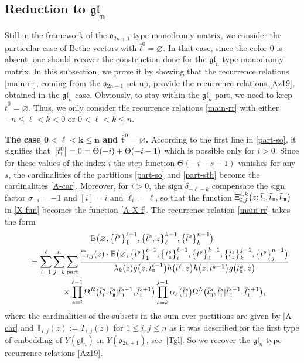 \documentclass[pdftex]{sigma}
\newcommand{\so}{\scriptscriptstyle \rm I}
\newcommand{\st}{\scriptscriptstyle \rm I\hspace{-1pt}I}
\newcommand{\sth}{\scriptscriptstyle \rm I\hspace{-1pt}I\hspace{-1pt}I}
\newcommand{\bt}{{\bar t}}
\theoremstyle{definition}
\def\BB{{\mathbb{B}}}
\def\TT{{\mathbb{T}}}
\def\r#1{\eqref{#1}}
\def\Oml{\Omega^L}
\def\Omr{\Omega^R}
\begin{document}
\subsection[Reduction to gl\_n]{Reduction to $\boldsymbol{\mathfrak{gl}_n}$}\label{sect:red-gln}
Still in the framework of the $\mathfrak{o}_{2n+1}$-type monodromy matrix,
we consider the particular case of Bethe vectors with $\bt^0=\varnothing$. In that case,
since the color 0 is absent, one should recover the construction done for the
$\mathfrak{gl}_{n}$-type monodromy matrix. In this subsection, we prove it by showing that the recurrence relations
\r{main-rr}, coming from the $\mathfrak{o}_{2n+1}$ set-up, provide the recurrence relations \eqref{Az19},
obtained in the
$\mathfrak{gl}_{n}$ case. Obviously, to stay within the $\mathfrak{gl}_{n}$ part, we need to keep
$\bt^0=\varnothing$. Thus, we only consider the recurrence relations
\r{main-rr} with either $-n\leq \ell< k<0$ or $0<\ell< k\leq n$.


{\bf The case $\boldsymbol{0<\ell<k\leq n}$ and $\boldsymbol{\bt^0=\varnothing}$.} According to the first line in
\r{part-so}, it signifies that~${\big|\bt^0_{\so}\big|=0=\Theta(-i)+\Theta(-i-1)}$
which is possible only for $i>0$. Since for these values of the index $i$
the step function
$\Theta(-i-s-1)$ vanishes for any $s$, the cardinalities of the partitions
\r{part-so} and \r{part-sth} become the cardinalities \r{A-car}. Moreover, for $i>0$,
 the sign $\delta_{-\ell-k}$ compensate the sign factor
$\sigma_{-i}=-1$ and $[i]=i$ and $\ell_i=\ell$, so that
the function $\Xi^{\ell,k}_{i,j}\bigl(z;\bt_{\so},\bt_{\st},\bt_{\sth}\bigr)$ in \r{X-fun}
becomes the function
\r{A-X-f}.
The recurrence relation \r{main-rr} takes the form
\begin{gather}
\BB\bigl(\varnothing,\bigl\{\bt^s\bigr\}_1^{\ell-1},\bigl\{\bt^{s},z\bigr\}_{\ell}^{k-1},\bigl\{\bt^s\bigr\}_k^{n-1}\bigr)\nonumber\\
\qquad=\sum_{i=1}^{\ell}\sum_{j=k}^n \sum_{\rm part}
\frac{\TT_{i,j}(z)\cdot\BB\bigl(\varnothing,\bigl\{\bt^s\bigr\}_{1}^{i-1},\bigl\{\bt^s_{\st}\bigr\}_{i}^{\ell-1},
\bigl\{\bt^s\bigr\}_{\ell}^{k-1},\bigl\{\bt^s_{\st}\bigr\}_{k}^{j-1},\bigl\{\bt^s\bigr\}_{j}^{n-1}\bigr)}
{\lambda_k(z) g\bigl(z,\bt^{\ell-1}_{\st}\bigr) h\bigl(\bt^{\ell},z\bigr) h\bigl(z,\bt^{k-1}\bigr)
g\bigl(\bt^k_{\st},z\bigr)}\nonumber\\
\phantom{\qquad=}{}\times
\prod_{s=i}^{\ell-1}\Omr\bigl(\bt^s_{\so},\bt^s_{\st}|\bt^{s-1}_{\st},\bt^{s+1}_{\st}\bigr)
\prod_{s=k}^{j-1}\alpha_s\bigl(\bt^s_{\so}\bigr)
\Oml\bigl(\bt^s_{\st},\bt^s_{\so}|\bt^{s-1}_{\st},\bt^{s+1}_{\st}\bigr) ,\label{gl-red1}
\end{gather}
where the cardinalities of the subsets in the sum over partitions
are given by \r{A-car} and $\TT_{i,j}(z):= T_{i,j}(z)$ for
$1\leq i,j\leq n$ as it was described for the first type of
embedding of $Y(\mathfrak{gl}_n)$ in $Y(\mathfrak{o}_{2n+1})$, see~\r{Tgl}. So we recover the
$\mathfrak{gl}_n$-type recurrence relations \r{Az19}.
\end{document}

